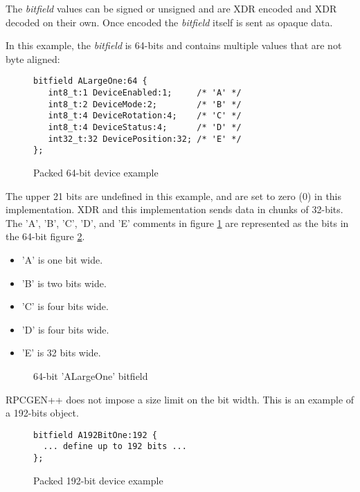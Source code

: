 The \textit{bitfield} values can be signed or unsigned and
are XDR encoded and XDR decoded on their own.
Once encoded the \textit{bitfield} itself is sent as
opaque data.

In this example, the \textit{bitfield} is 64-bits and
contains multiple values that are not byte aligned:
\begin{figure}
\begin{verbatim}
bitfield ALargeOne:64 {
   int8_t:1 DeviceEnabled:1;     /* 'A' */
   int8_t:2 DeviceMode:2;        /* 'B' */
   int8_t:4 DeviceRotation:4;    /* 'C' */
   int8_t:4 DeviceStatus:4;      /* 'D' */
   int32_t:32 DevicePosition:32; /* 'E' */
};
\end{verbatim}
\caption{Packed 64-bit device example}
\label{fig:ALargeOneXDR}
\end{figure}
The upper 21 bits are undefined in this example,
and are set to zero (0) in this
implementation.
XDR and this implementation sends data in chunks of 32-bits.
The 'A', 'B', 'C', 'D', and 'E' comments in figure
\ref{fig:ALargeOneXDR} are represented as the bits in
the 64-bit figure \ref{fig:ALargeOneBitsXDR}.
\begin{itemize}
\item 'A' is one bit wide.
\item 'B' is two bits wide.
\item 'C' is four bits wide.
\item 'D' is four bits wide.
\item 'E' is 32 bits wide.
\end{itemize}
\begin{figure}
  
  \caption{64-bit 'ALargeOne' bitfield}
  \label{fig:ALargeOneBitsXDR}
\end{figure}

RPCGEN++ does not impose a size limit on the bit width.
This is an example of a 192-bits object.

\begin{figure}
\begin{verbatim}
bitfield A192BitOne:192 {
  ... define up to 192 bits ...
};
\end{verbatim}
\caption{Packed 192-bit device example}
\label{fig:A192BitXDR}
\end{figure}

